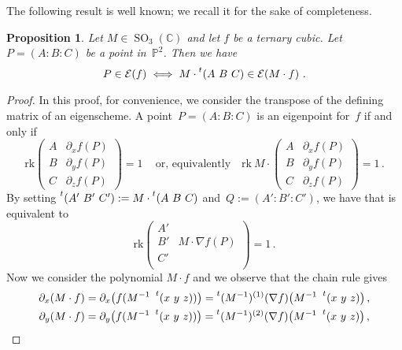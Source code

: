 \documentclass[a4paper, 11pt, reqno]{amsart}
\theoremstyle{plain}
\newtheorem{prop}[lemma]{Proposition}
\theoremstyle{definition}
\newcommand{\C}{\mathbb{C}}
\newcommand{\p}{\mathbb{P}}
\newcommand{\de}{\partial}
\newcommand{\rk}{\ensuremath{\mathrm{rk}}}
\newcommand{\SO}{\operatorname{SO}}
\newcommand{\Eig}[1]{\mathcal{E}\!\left( {#1} \right)}
\begin{document}
The following result is well known; we recall it for the sake of completeness.

\begin{prop}
Let $M \in \SO_3(\C)$ and let $f$ be a ternary cubic.
Let $P = (A: B: C)$ be a point in~$\p^2$.
Then we have
%
\[
  P \in \Eig{f} \iff M \cdot \prescript{t} {}(A \ B \ C) \in \Eig{M \cdot f} \,.
\]
%
\end{prop}
\begin{proof}
In this proof, for convenience,
we consider the transpose of the defining matrix of an eigenscheme.
A point~$P = (A: B: C)$ is an eigenpoint for~$f$ if and only if
%
\begin{equation}
\label{eq:def_matrix_M}
  \mathrm{rk}
  \begin{pmatrix}
    A & \de_x f(P) \\
    B & \de_y f(P) \\
    C & \de_z f(P)
  \end{pmatrix}
  = 1 \,
 \quad \text{or, equivalently} \quad
  \mathrm{rk} \ M \cdot 
  \begin{pmatrix}
    A & \de_x f(P) \\
    B & \de_y f(P) \\
    C & \de_z f(P)
  \end{pmatrix}
  = 1 \,.
\end{equation}
%
By setting $\prescript{t} {}(A' \ B' \ C' ) := M \cdot \prescript{t} {}(A \ B \ C) $ and~$Q := (A':B':C')$, we have that 
is equivalent to
%
\begin{equation}
\label{eq:transformed}
  \rk
  \begin{pmatrix}
    A' & \\
    B' & M \cdot \nabla f (P) \\
    C' & \\
  \end{pmatrix}
  = 1 \,.
\end{equation}
%
Now we consider the polynomial $M \cdot f$ and we observe that the chain rule gives
%
\begin{gather*}
  \partial_x (M\cdot f) = \partial_x \bigl( f(M^{-1} \ \prescript{t} {} (x \ y \ z)) \bigr) = \prescript{t} {}(M^{-1})^{(1)}(\nabla f) \bigl( M^{-1}\ \prescript{t} {} (x \ y \ z) \bigr) \,, \\
  \partial_y (M\cdot f) = \partial_y \bigl( f(M^{-1} \ \prescript{t} {} (x \ y \ z)) \bigr) = \prescript{t} {}(M^{-1})^{(2)}(\nabla f) \bigl( M^{-1}\ \prescript{t} {} (x \ y \ z) \bigr) \,, \\

\end{gather*}
\end{proof}
\end{document}
